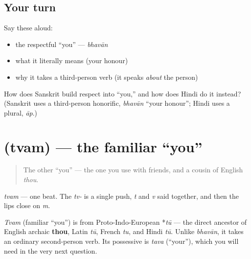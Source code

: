 \subsection*{Your turn}
Say these aloud:

\begin{itemize}
\raggedright
  \item the respectful \textquotedblleft{}you\textquotedblright{} — \emph{bhavān}
  \item what it literally means (your honour)
  \item why it takes a third-person verb (it speaks \emph{about} the person)
\end{itemize}

\begin{tcolorbox}[breakable,colback=teal!4,colframe=teal!35!black,title={Before you move on}]
How does Sanskrit build respect into \textquotedblleft{}you,\textquotedblright{} and how does Hindi do it instead? (Sanskrit uses a third-person honorific, \emph{bhavān} \textquotedblleft{}your honour\textquotedblright{}; Hindi uses a plural, \emph{āp}.)
\end{tcolorbox}
\section[\texorpdfstring{\sk{त्वम्} (tvam)}{त्वम् (tvam)}]{ (tvam) — the familiar \textquotedblleft{}you\textquotedblright{}}

\label{lesson:SA-C02-tvam}



\begin{quote}
The other \textquotedblleft{}you\textquotedblright{} — the one you use with friends, and a cousin of English \emph{thou}.
\end{quote}

\begin{sounds}
\emph{tvam} — one beat. The \emph{tv-} is a single push, \emph{t} and \emph{v} said together, and then the lips close on \emph{m}.
\end{sounds}

\begin{cousinweb}
\emph{Tvam} (familiar \textquotedblleft{}you\textquotedblright{}) is from Proto-Indo-European *\emph{tū} — the direct ancestor of English archaic \textbf{thou}, Latin \emph{tū}, French \emph{tu}, and Hindi \emph{tū}. Unlike \emph{bhavān}, it takes an ordinary second-person verb. Its possessive is \emph{tava} (\textquotedblleft{}your\textquotedblright{}), which you will need in the very next question.
\end{cousinweb}

